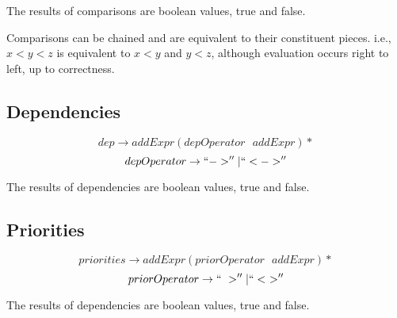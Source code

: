 \documentclass[12pt]{article}
\begin{document}
The results of comparisons are boolean values, true and false.

Comparisons can be chained and are equivalent to their constituent pieces. i.e., $x < y < z$ is equivalent to $x < y$ and $y < z$, although evaluation occurs right to left, up to correctness.

\subsection{Dependencies}

$$dep \rightarrow addExpr (depOperator \text{ } addExpr)*$$
$$depOperator \rightarrow ``->'' \vert ``<->''$$

The results of dependencies are boolean values, true and false. 

\subsection{Priorities}

$$priorities \rightarrow addExpr (priorOperator \text{ } addExpr)*$$
$$priorOperator \rightarrow ``~>'' \vert ``<~>''$$

The results of dependencies are boolean values, true and false.
\end{document}
